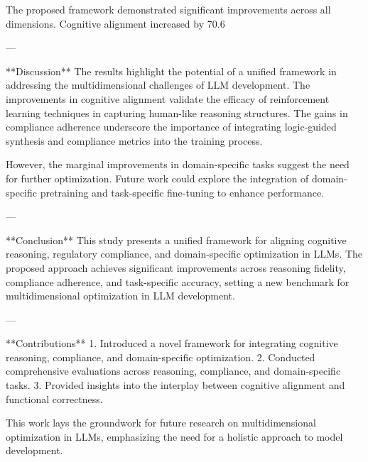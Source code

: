 The proposed framework demonstrated significant improvements across all dimensions. Cognitive alignment increased by 70.6%

---

**Discussion**  
The results highlight the potential of a unified framework in addressing the multidimensional challenges of LLM development. The improvements in cognitive alignment validate the efficacy of reinforcement learning techniques in capturing human-like reasoning structures. The gains in compliance adherence underscore the importance of integrating logic-guided synthesis and compliance metrics into the training process.

However, the marginal improvements in domain-specific tasks suggest the need for further optimization. Future work could explore the integration of domain-specific pretraining and task-specific fine-tuning to enhance performance.

---

**Conclusion**  
This study presents a unified framework for aligning cognitive reasoning, regulatory compliance, and domain-specific optimization in LLMs. The proposed approach achieves significant improvements across reasoning fidelity, compliance adherence, and task-specific accuracy, setting a new benchmark for multidimensional optimization in LLM development.

---

**Contributions**  
1. Introduced a novel framework for integrating cognitive reasoning, compliance, and domain-specific optimization.  
2. Conducted comprehensive evaluations across reasoning, compliance, and domain-specific tasks.  
3. Provided insights into the interplay between cognitive alignment and functional correctness.  

This work lays the groundwork for future research on multidimensional optimization in LLMs, emphasizing the need for a holistic approach to model development.